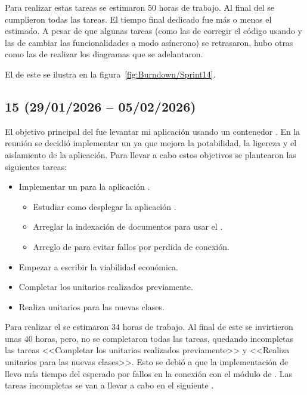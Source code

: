 Para realizar estas tareas se estimaron 50 horas de trabajo. Al final del  se cumplieron todas las tareas. El tiempo final dedicado fue más o menos el estimado. A pesar de que algunas tareas (como las de corregir el código usando  y las de cambiar las funcionalidades a modo asíncrono) se retrasaron, hubo otras como las de realizar los diagramas que se adelantaron.

El  de este  se ilustra en la figura~\ref{fig:Burndown/Sprint14}.

\subsection{ 15 (29/01/2026 -- 05/02/2026)}
El objetivo principal del  fue levantar mi aplicación  usando un contenedor . En la reunión se decidió implementar un  ya que mejora la potabilidad, la ligereza y el aislamiento de la aplicación. Para llevar a cabo estos objetivos se plantearon las siguientes tareas:
\begin{itemize}
\tightlist
	\item Implementar un  para la aplicación .
	\begin{itemize}
	\tightlist
		\item Estudiar como desplegar la aplicación .
		\item Arreglar la indexación de documentos para usar el .
		\item Arreglo de  para evitar fallos por perdida de conexión.
	\end{itemize}
	\item Empezar a escribir la viabilidad económica.
	\item Completar los  unitarios realizados previamente.
	\item Realiza  unitarios para las nuevas clases.
\end{itemize}

Para realizar el  se estimaron 34 horas de trabajo. Al final de este  se invirtieron unas 40 horas, pero, no se completaron todas las tareas, quedando incompletas las tareas <<Completar los  unitarios realizados previamente>> y <<Realiza  unitarios para las nuevas clases>>. Esto se debió a que la implementación de  llevo más tiempo del esperado por fallos en la conexión con el módulo de . Las tareas incompletas se van a llevar a cabo en el siguiente .

